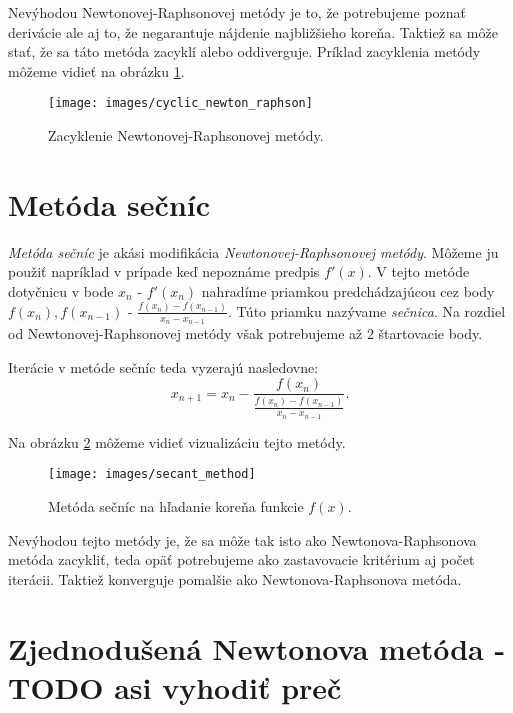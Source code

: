 Nevýhodou Newtonovej-Raphsonovej metódy je to, že potrebujeme poznať derivácie ale aj to, že negarantuje nájdenie
najbližšieho koreňa. Taktiež sa môže stať, že sa táto metóda zacyklí alebo oddiverguje. 
Príklad zacyklenia metódy môžeme vidieť
na obrázku \ref{obr:cyclic_newton_raphson}.

\begin{figure}
    \centerline{\texttt{[image: images/cyclic\_newton\_raphson]}}
    \caption[Zacyklenie Newtonovej-Raphsonovej metódy]{Zacyklenie Newtonovej-Raphsonovej metódy.}
    \label{obr:cyclic_newton_raphson}
\end{figure}

\section{Metóda sečníc}

\textit{Metóda sečníc} je akási modifikácia \textit{Newtonovej-Raphsonovej metódy}. 
Môžeme ju použiť napríklad v prípade keď nepoznáme predpis $f'(x)$. 
V tejto metóde dotyčnicu v bode $x_n$ - $f'(x_n)$ nahradíme priamkou 
predchádzajúcou cez body $f(x_n), f(x_{n-1})$ - $\frac{f(x_n) - f(x_{n-1})}{x_n - x_{n-1}}$. 
Túto priamku nazývame \textit{sečnica}. 
Na rozdiel od Newtonovej-Raphsonovej metódy však potrebujeme až $2$ štartovacie body.

Iterácie v metóde sečníc teda vyzerajú nasledovne:
$$ x_{n+1} = x_n - \frac{f(x_n)}{\frac{f(x_n) - f(x_{n-1})}{x_n - x_{n-1}}}.$$

Na obrázku \ref{obr:secant_method} môžeme vidieť vizualizáciu tejto metódy.

\begin{figure}
    \centerline{\texttt{[image: images/secant\_method]}}
    \caption[Metóda sečníc]{Metóda sečníc na hľadanie koreňa funkcie $f(x)$.}
    \label{obr:secant_method}
\end{figure}

Nevýhodou tejto metódy je, že sa môže tak isto ako Newtonova-Raphsonova metóda zacykliť, teda 
opäť potrebujeme ako zastavovacie kritérium aj počet iterácii. Taktiež konverguje
pomalšie ako Newtonova-Raphsonova metóda.

\iffalse
\section{Zjednodušená Newtonova metóda - TODO asi vyhodiť preč}

